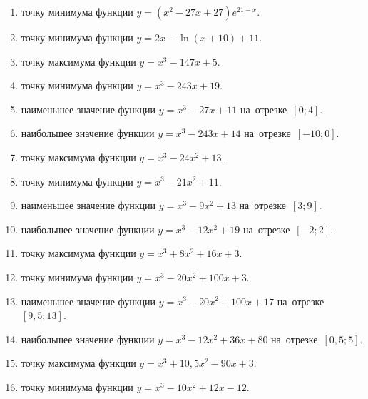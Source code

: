 \documentclass[a4paper,10pt]{article}
\begin{document}
\begin{enumerate}
\item {} точку минимума функции $y=\left(x^2-27x+27\right){{e}^{21-x}}$.

\item {} точку минимума функции $y=2x-\ln \left(x+10\right)+11$.

\item {} точку максимума функции $y=x^3 -147x +5$.

\item {} точку минимума функции $y=x^3 -243x+19$.

\item {} наименьшее значение функции $y=x^3 -27x+11$ на~отрезке~$\left[0;4\right]$.

\item {} наибольшее значение функции $y=x^3 -243x+14$ на~отрезке~$\left[-10;0\right]$.

\item {} точку максимума функции $y=x^3 -24x^2+13$.

\item {} точку минимума функции $y=x^3 -21x^2+11$.

\item {} наименьшее значение функции $y=x^3 -9x^2+13$ на~отрезке~$\left[3;9\right]$.

\item {} наибольшее значение функции $y=x^3 -12x^2+19$ на~отрезке~$\left[-2;2\right]$.

\item {} точку максимума функции $y=x^3 +8x^2+16x+3$.

\item {} точку минимума функции $y=x^3 -20x^2+100x+3$.

\item {} наименьшее значение функции $y=x^3 -20x^2+100x+17$ на~отрезке~$\left[9,5;13\right]$.

\item {} наибольшее значение функции $y=x^3 -12x^2+36x+80$ на~отрезке~$\left[0,5;5\right]$.

\item {} точку максимума функции $y=x^3 +10,5x^2-90x+3$.

\item {} точку минимума функции $y=x^3 -10x^2+12x-12$.


\end{enumerate}
\end{document}
